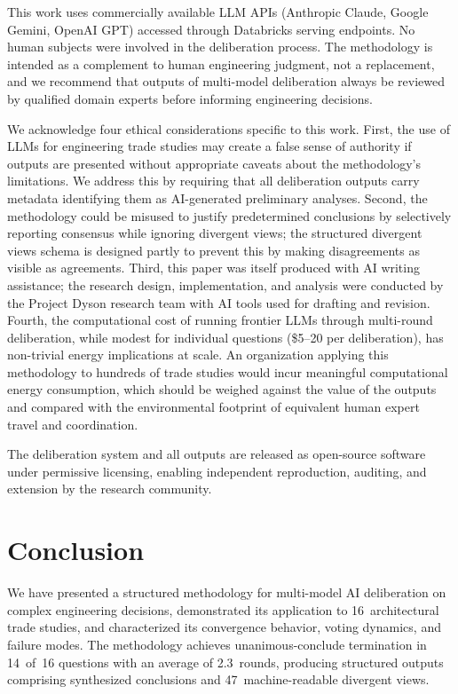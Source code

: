 \documentclass[11pt,a4paper]{article}
\begin{document}
This work uses commercially available LLM APIs (Anthropic Claude, Google Gemini, OpenAI GPT) accessed through Databricks serving endpoints. No human subjects were involved in the deliberation process. The methodology is intended as a complement to human engineering judgment, not a replacement, and we recommend that outputs of multi-model deliberation always be reviewed by qualified domain experts before informing engineering decisions.

We acknowledge four ethical considerations specific to this work. First, the use of LLMs for engineering trade studies may create a false sense of authority if outputs are presented without appropriate caveats about the methodology's limitations. We address this by requiring that all deliberation outputs carry metadata identifying them as AI-generated preliminary analyses. Second, the methodology could be misused to justify predetermined conclusions by selectively reporting consensus while ignoring divergent views; the structured divergent views schema is designed partly to prevent this by making disagreements as visible as agreements. Third, this paper was itself produced with AI writing assistance; the research design, implementation, and analysis were conducted by the Project Dyson research team with AI tools used for drafting and revision. Fourth, the computational cost of running frontier LLMs through multi-round deliberation, while modest for individual questions (\$5--20 per deliberation), has non-trivial energy implications at scale. An organization applying this methodology to hundreds of trade studies would incur meaningful computational energy consumption, which should be weighed against the value of the outputs and compared with the environmental footprint of equivalent human expert travel and coordination.

The deliberation system and all outputs are released as open-source software under permissive licensing, enabling independent reproduction, auditing, and extension by the research community.

\section{Conclusion}
\label{sec:conclusion}

We have presented a structured methodology for multi-model AI deliberation on complex engineering decisions, demonstrated its application to 16~architectural trade studies, and characterized its convergence behavior, voting dynamics, and failure modes. The methodology achieves unanimous-conclude termination in 14~of~16 questions with an average of 2.3~rounds, producing structured outputs comprising synthesized conclusions and 47~machine-readable divergent views.
\end{document}
